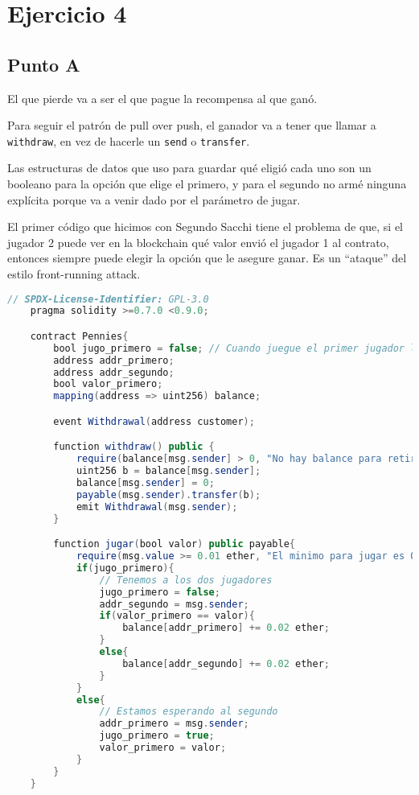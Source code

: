 \documentclass[12pt]{article}
\begin{document}
\section*{Ejercicio 4}
\subsection*{Punto A}
El que pierde va a ser el que pague la recompensa al que ganó.

Para seguir el patrón de pull over push, el ganador va a tener que llamar a \texttt{withdraw}, en vez de hacerle un \texttt{send} o \texttt{transfer}.

Las estructuras de datos que uso para guardar qué eligió cada uno son un booleano para la opción que elige el primero, y para el segundo no armé ninguna explícita porque va a venir dado por el parámetro de jugar.

El primer código que hicimos con Segundo Sacchi tiene el problema de que, si el jugador 2 puede ver en la blockchain qué valor envió el jugador 1 al contrato, entonces siempre puede elegir la opción que le asegure ganar. Es un ``ataque'' del estilo front-running attack.


\begin{lstlisting}[language=Java]
    // SPDX-License-Identifier: GPL-3.0
    pragma solidity >=0.7.0 <0.9.0;

    contract Pennies{
        bool jugo_primero = false; // Cuando juegue el primer jugador lo pongo en True, cuando juegue el segundo lo pongo en False 
        address addr_primero;
        address addr_segundo; 
        bool valor_primero;
        mapping(address => uint256) balance; 

        event Withdrawal(address customer);

        function withdraw() public {
            require(balance[msg.sender] > 0, "No hay balance para retirar");
            uint256 b = balance[msg.sender];
            balance[msg.sender] = 0;
            payable(msg.sender).transfer(b);
            emit Withdrawal(msg.sender);
        }

        function jugar(bool valor) public payable{
            require(msg.value >= 0.01 ether, "El minimo para jugar es 0,01 eth"); // Si manda mas se lo queda la casa como donacion
            if(jugo_primero){
                // Tenemos a los dos jugadores
                jugo_primero = false; 
                addr_segundo = msg.sender; 
                if(valor_primero == valor){
                    balance[addr_primero] += 0.02 ether;  
                }
                else{
                    balance[addr_segundo] += 0.02 ether;
                }
            }
            else{
                // Estamos esperando al segundo 
                addr_primero = msg.sender;
                jugo_primero = true;
                valor_primero = valor;
            }
        }
    }
\end{lstlisting}
\end{document}
